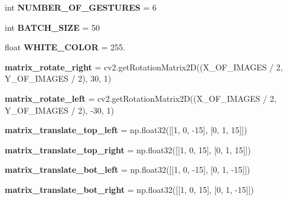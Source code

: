 \begin{DoxyCompactItemize}
int {\bfseries N\+U\+M\+B\+E\+R\+\_\+\+O\+F\+\_\+\+G\+E\+S\+T\+U\+R\+ES} = 6
\item 
\mbox{\label{namespaceCreateModel_aff0245a5a8e75afd246d7a9fdb6d954d}} 
int {\bfseries B\+A\+T\+C\+H\+\_\+\+S\+I\+ZE} = 50
\item 
\mbox{\label{namespaceCreateModel_a1378a27e386eec054835aa6fa3d7aef5}} 
float {\bfseries W\+H\+I\+T\+E\+\_\+\+C\+O\+L\+OR} = 255.
\item 
\mbox{\label{namespaceCreateModel_a4ee5b85e526c6fee1bdd4a2ca901ab91}} 
{\bfseries matrix\+\_\+rotate\+\_\+right} = cv2.\+get\+Rotation\+Matrix2D((X\+\_\+\+O\+F\+\_\+\+I\+M\+A\+G\+ES / 2, Y\+\_\+\+O\+F\+\_\+\+I\+M\+A\+G\+ES / 2), 30, 1)
\item 
\mbox{\label{namespaceCreateModel_ab68d73fa857968927d5d2d4b0330e7f9}} 
{\bfseries matrix\+\_\+rotate\+\_\+left} = cv2.\+get\+Rotation\+Matrix2D((X\+\_\+\+O\+F\+\_\+\+I\+M\+A\+G\+ES / 2, Y\+\_\+\+O\+F\+\_\+\+I\+M\+A\+G\+ES / 2), -\/30, 1)
\item 
\mbox{\label{namespaceCreateModel_aea5e825cc10d1efa9e14927f0ef522ee}} 
{\bfseries matrix\+\_\+translate\+\_\+top\+\_\+left} = np.\+float32(\mbox{[}\mbox{[}1, 0, -\/15\mbox{]}, \mbox{[}0, 1, 15\mbox{]}\mbox{]})
\item 
\mbox{\label{namespaceCreateModel_ae9ca04b527734b99a3dc4a8dfb9b8cbe}} 
{\bfseries matrix\+\_\+translate\+\_\+top\+\_\+right} = np.\+float32(\mbox{[}\mbox{[}1, 0, 15\mbox{]}, \mbox{[}0, 1, 15\mbox{]}\mbox{]})
\item 
\mbox{\label{namespaceCreateModel_a3f62b3ff1071b4e9ae47d45aacadf4a7}} 
{\bfseries matrix\+\_\+translate\+\_\+bot\+\_\+left} = np.\+float32(\mbox{[}\mbox{[}1, 0, -\/15\mbox{]}, \mbox{[}0, 1, -\/15\mbox{]}\mbox{]})
\item 
\mbox{\label{namespaceCreateModel_a869705e838f1b0347b1bb8a968f69dfe}} 
{\bfseries matrix\+\_\+translate\+\_\+bot\+\_\+right} = np.\+float32(\mbox{[}\mbox{[}1, 0, 15\mbox{]}, \mbox{[}0, 1, -\/15\mbox{]}\mbox{]})
\end{DoxyCompactItemize}


